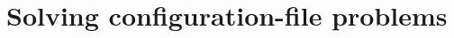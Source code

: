 \documentclass[11pt,oneside,chapters]{starlink}
\begin{document}





\section{Solving configuration-file problems}
\label{sec:problem}
\end{document}
